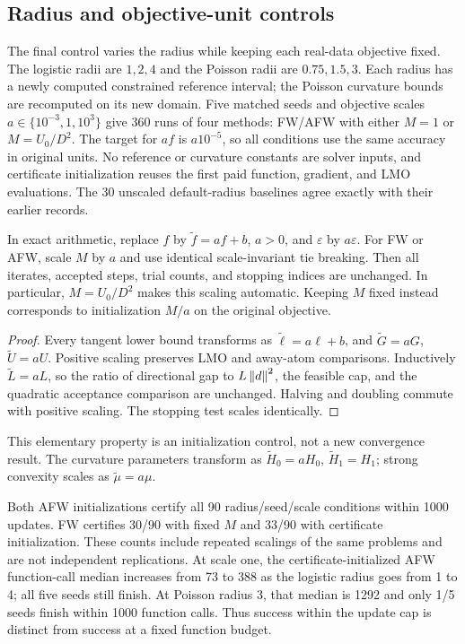 \subsection{Radius and objective-unit controls}
\label{sec:robustness}
The final control varies the radius while keeping each real-data objective
fixed. The logistic radii are $1,2,4$ and the Poisson radii are
$0.75,1.5,3$. Each radius has a newly computed constrained reference
interval; the Poisson curvature bounds are recomputed on its new domain.
Five matched seeds and objective scales $a\in\{10^{-3},1,10^3\}$ give
360 runs of four methods: FW/AFW with either $M=1$ or $M=U_0/D^2$.
The target for $af$ is $a10^{-5}$, so all conditions use the same
accuracy in original units. No reference or curvature constants are
solver inputs, and certificate initialization reuses the first paid
function, gradient, and LMO evaluations. The 30 unscaled default-radius
baselines agree exactly with their earlier records.

\begin{proposition}
\label{prop:units}
In exact arithmetic, replace $f$ by $\widetilde f=af+b$, $a>0$, and
$\varepsilon$ by $a\varepsilon$. For FW or AFW, scale $M$ by $a$ and
use identical scale-invariant tie breaking. Then all iterates, accepted
steps, trial counts, and stopping indices are unchanged. In particular,
$M=U_0/D^2$ makes this scaling automatic. Keeping $M$ fixed instead
corresponds to initialization $M/a$ on the original objective.
\end{proposition}
\begin{proof}
Every tangent lower bound transforms as $\widetilde\ell=a\ell+b$,
and $\widetilde G=aG$, $\widetilde U=aU$. Positive scaling preserves
LMO and away-atom comparisons. Inductively $\widetilde L=aL$, so the
ratio of directional gap to $L\left\|d\right\|^2$, the feasible cap, and the
quadratic acceptance comparison are unchanged. Halving and doubling
commute with positive scaling. The stopping test scales identically.
\end{proof}
This elementary property is an initialization control, not a new
convergence result. The curvature parameters transform as
$\widetilde H_0=aH_0$, $\widetilde H_1=H_1$; strong convexity scales
as $\widetilde\mu=a\mu$.

Both AFW initializations certify all 90 radius/seed/scale conditions
within 1000 updates. FW certifies 30/90 with fixed $M$ and 33/90 with
certificate initialization. These counts include repeated scalings of
the same problems and are not independent replications. At scale one,
the certificate-initialized AFW function-call median increases from
73 to 388 as the logistic radius goes from 1 to 4; all five seeds
still finish. At Poisson radius 3, that median is 1292 and only 1/5
seeds finish within 1000 function calls. Thus success within the update
cap is distinct from success at a fixed function budget.

